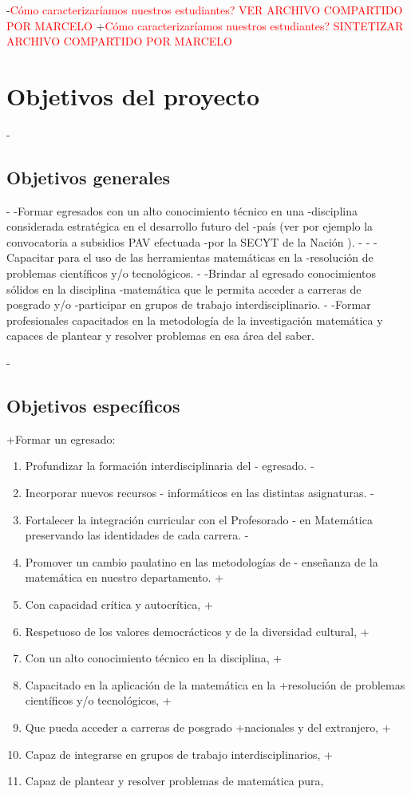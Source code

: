 \begin{description}
-\textcolor{red}{Cómo caracterizaríamos nuestros estudiantes? VER ARCHIVO COMPARTIDO POR MARCELO}
+\textcolor{red}{Cómo caracterizaríamos nuestros estudiantes? SINTETIZAR  ARCHIVO COMPARTIDO POR MARCELO}
 
 \section{Objetivos del proyecto}
-\subsection{Objetivos generales}
-
-Formar egresados con un alto conocimiento técnico en una
-disciplina considerada estratégica en el desarrollo futuro del
-país (ver por ejemplo la convocatoria a subsidios PAV efectuada
-por la SECYT de la Nación \cite{pav2003}).
-
-
-Capacitar para el uso de las herramientas matemáticas en la
-resolución de problemas científicos y/o tecnológicos.
-
-Brindar  al egresado  conocimientos sólidos en la disciplina
-matemática que le permita acceder a carreras de posgrado y/o
-participar en grupos de trabajo interdisciplinario.
-
-Formar profesionales capacitados en la metodología de la investigación matemática y capaces de plantear y resolver problemas en esa área del saber.
 
-\subsection{Objetivos específicos}
 
+Formar un egresado:
 
 \begin{enumerate}
 
-
-    \item Profundizar la  formación interdisciplinaria del
-    egresado.
-    \item Incorporar nuevos  recursos
-    informáticos en las distintas asignaturas.
-    \item Fortalecer la integración curricular con el Profesorado
-    en Matemática preservando las identidades de cada carrera.
-    \item Promover un cambio paulatino en las metodologías de
-    enseñanza de la matemática en nuestro departamento.
+ \item Con capacidad crítica y autocrítica,
+ \item Respetuoso de los valores democrácticos y de la diversidad cultural,  
+  \item Con un alto conocimiento técnico en la disciplina,
+ \item Capacitado en la aplicación de la matemática en la
+resolución de problemas científicos y/o tecnológicos,
+\item Que pueda acceder a carreras de posgrado 
+nacionales y del extranjero, 
+\item Capaz de integrarse en grupos de trabajo interdisciplinarios,
+\item Capaz de plantear y resolver problemas de matemática pura,
 

\end{enumerate}
\end{description}
